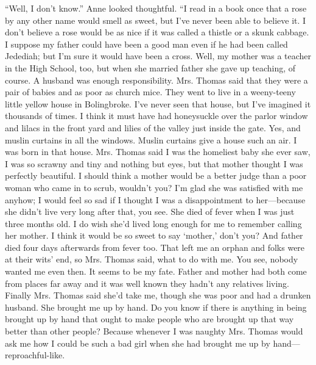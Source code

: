 \documentclass[a4paper]{article}
\begin{document}
``Well, I don't know.'' Anne looked thoughtful. ``I read in a book once that a rose by any other name would smell as sweet, but I've never been able to believe it. I don't believe a rose would be as nice if it was called a thistle or a skunk cabbage. I suppose my father could have been a good man even if he had been called Jedediah; but I'm sure it would have been a cross. Well, my mother was a teacher in the High School, too, but when she married father she gave up teaching, of course. A husband was enough responsibility. Mrs. Thomas said that they were a pair of babies and as poor as church mice. They went to live in a weeny-teeny little yellow house in Bolingbroke. I've never seen that house, but I've imagined it thousands of times. I think it must have had honeysuckle over the parlor window and lilacs in the front yard and lilies of the valley just inside the gate. Yes, and muslin curtains in all the windows. Muslin curtains give a house such an air. I was born in that house. Mrs. Thomas said I was the homeliest baby she ever saw, I was so scrawny and tiny and nothing but eyes, but that mother thought I was perfectly beautiful. I should think a mother would be a better judge than a poor woman who came in to scrub, wouldn't you? I'm glad she was satisfied with me anyhow; I would feel so sad if I thought I was a disappointment to her---because she didn't live very long after that, you see. She died of fever when I was just three months old. I do wish she'd lived long enough for me to remember calling her mother. I think it would be so sweet to say `mother,' don't you? And father died four days afterwards from fever too. That left me an orphan and folks were at their wits' end, so Mrs. Thomas said, what to do with me. You see, nobody wanted me even then. It seems to be my fate. Father and mother had both come from places far away and it was well known they hadn't any relatives living. Finally Mrs. Thomas said she'd take me, though she was poor and had a drunken husband. She brought me up by hand. Do you know if there is anything in being brought up by hand that ought to make people who are brought up that way better than other people? Because whenever I was naughty Mrs. Thomas would ask me how I could be such a bad girl when she had brought me up by hand---reproachful-like.
\end{document}

